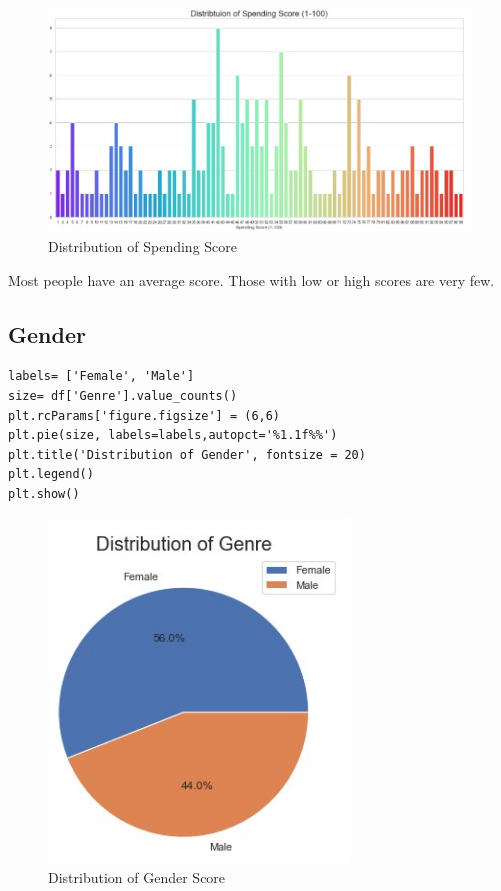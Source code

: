 \documentclass{article}
\begin{document}
\begin{figure}[htp]
    \centering
    \includegraphics[width=18cm]{Spending Score (1).jpg}
    \caption{Distribution of Spending Score}
    \label{fig:Distribution of Spending Score}
\end{figure}

Most people have an average score.
Those with low or high scores are very few. 
\subsection{Gender}

\begin{lstlisting}
labels= ['Female', 'Male']
size= df['Genre'].value_counts()
plt.rcParams['figure.figsize'] = (6,6)
plt.pie(size, labels=labels,autopct='%1.1f%%')
plt.title('Distribution of Gender', fontsize = 20)
plt.legend()
plt.show()
\end{lstlisting}
\vspace{5cm}
\begin{figure}[htp]
    \centering
    \includegraphics[width=8cm]{Gender.jpg}
    \caption{Distribution of Gender Score}
    \label{fig:Distribution of Gender}
\end{figure}
\end{document}
